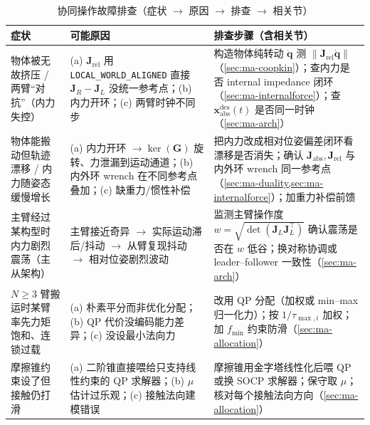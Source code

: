 \begin{table}[H]\centering\small
\caption{协同操作故障排查（症状 $\to$ 原因 $\to$ 排查 $\to$ 相关节）}
\label{tab:ma-troubleshoot}
\begin{tabular}{p{3.0cm}p{4.6cm}p{5.2cm}}
\toprule
症状 & 可能原因 & 排查步骤（含相关节） \\
\midrule
物体被无故挤压 / 两臂“对抗”（内力失控） & (a) $\mathbf{J}_{\text{rel}}$ 用 \texttt{LOCAL\_WORLD\_ALIGNED} 直接 $\mathbf{J}_R-\mathbf{J}_L$ 没统一参考点；(b) 内力开环；(c) 两臂时钟不同步 & 构造物体纯转动 $\dot{\mathbf{q}}$ 测 $\|\mathbf{J}_{\text{rel}}\dot{\mathbf{q}}\|$（\cref{sec:ma-coopkin}）；查内力是否 internal impedance 闭环（\cref{sec:ma-internalforce}）；查 $\mathbf{x}_{\text{abs}}^{\text{des}}(t)$ 是否同一时钟（\cref{sec:ma-arch}） \\
物体能搬动但轨迹漂移 / 内力随姿态缓慢增长 & (a) 内力开环 $\to\ker(\mathbf{G})$ 旋转、力泄漏到运动通道；(b) 内外环 wrench 在不同参考点叠加；(c) 缺重力/惯性补偿 & 把内力改成相对位姿偏差闭环看漂移是否消失；确认 $\mathbf{J}_{\text{abs}},\mathbf{J}_{\text{rel}}$ 与内外环 wrench 同一参考点（\cref{sec:ma-duality,sec:ma-internalforce}）；加重力补偿前馈 \\
主臂经过某构型时内力剧烈震荡（主从架构） & 主臂接近奇异 $\to$ 实际运动滞后/抖动 $\to$ 从臂复现抖动 $\to$ 相对位姿剧烈波动 & 监测主臂操作度 $w=\sqrt{\det(\mathbf{J}_L\mathbf{J}_L^\top)}$ 确认震荡是否在 $w$ 低谷；换对称协调或 leader--follower 一致性（\cref{sec:ma-arch}） \\
$N\ge3$ 臂搬运时某臂率先力矩饱和、连锁过载 & (a) 朴素平分而非优化分配；(b) QP 代价没编码能力差异；(c) 没设最小法向力 & 改用 QP 分配（加权或 min--max 归一化力）；按 $1/\tau_{\max,i}$ 加权；加 $f_{\min}$ 约束防滑（\cref{sec:ma-allocation}） \\
摩擦锥约束设了但接触仍打滑 & (a) 二阶锥直接喂给只支持线性约束的 QP 求解器；(b) $\mu$ 估计过乐观；(c) 接触法向建模错误 & 摩擦锥用金字塔线性化后喂 QP 或换 SOCP 求解器；保守取 $\mu$；核对每个接触法向方向（\cref{sec:ma-allocation}） \\
\bottomrule
\end{tabular}
\end{table}
